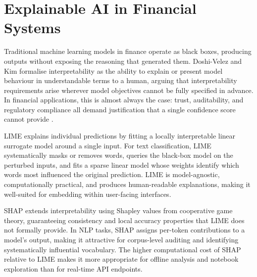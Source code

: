 \section{Explainable AI in Financial Systems}

Traditional machine learning models in finance operate as black boxes, producing outputs without exposing the reasoning that generated them.  Doshi-Velez and Kim \citep{doshivelez2017interpretable} formalise interpretability as the ability to explain or present model behaviour in understandable terms to a human, arguing that interpretability requirements arise wherever model objectives cannot be fully specified in advance.  In financial applications, this is almost always the case: trust, auditability, and regulatory compliance all demand justification that a single confidence score cannot provide \citep{yeo2023xai}.

LIME \citep{ribeiro2016lime} explains individual predictions by fitting a locally interpretable linear surrogate model around a single input.  For text classification, LIME systematically masks or removes words, queries the black-box model on the perturbed inputs, and fits a sparse linear model whose weights identify which words most influenced the original prediction.  LIME is model-agnostic, computationally practical, and produces human-readable explanations, making it well-suited for embedding within user-facing interfaces.

SHAP \citep{lundberg2017shap} extends interpretability using Shapley values from cooperative game theory, guaranteeing consistency and local accuracy properties that LIME does not formally provide.  In NLP tasks, SHAP assigns per-token contributions to a model's output, making it attractive for corpus-level auditing and identifying systematically influential vocabulary.  The higher computational cost of SHAP relative to LIME makes it more appropriate for offline analysis and notebook exploration than for real-time API endpoints.

